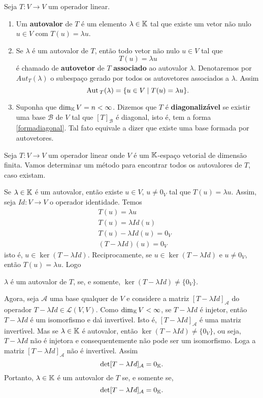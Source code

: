 \begin{definicao}
	Seja $T : V \to V$ um operador linear.
	\begin{enumerate}[label={\roman*})]
		\item Um \textbf{autovalor} de $T$ \'e um elemento $\lambda \in \mathbb{K}$ tal que existe um vetor n\~ao nulo $u \in V$ com $T(u) = \lambda u$.
		\item Se $\lambda$ \'e um autovalor de $T$, ent\~ao todo vetor n\~ao nulo $u \in V$ tal que
		\[
			T(u) = \lambda u
		\]
		\'e chamado de \textbf{autovetor} de $T$ \textbf{associado} ao autovalor $\lambda$. Denotaremos por $Aut_T(\lambda)$ o subespa\c{c}o gerado por todos os autovetores associados a $\lambda$. Assim
		\[
			{\rm Aut\,}_T(\lambda) = \{u \in V \mid T(u) = \lambda u\}.
		\]
		\item Suponha que $\dim_{\mathbb{K}} V = n < \infty$. Dizemos que $T$ \'e \textbf{diagonaliz\'avel} se existir uma base $\mathcal{B}$ de $V$ tal que $[T]_\mathcal{B}$ \'e diagonal, isto \'e, tem a forma \eqref{formadiagonal}. Tal fato equivale a dizer que existe uma base formada por autovetores.
	\end{enumerate}
\end{definicao}

Seja $T : V \to V$ um operador linear onde $V$ \'e um $\mathbb{K}$-espa\c{c}o vetorial de dimens\~ao finita. Vamos determinar um m\'etodo para encontrar todos os autovalores de $T$, caso existam.

Se $\lambda \in \mathbb{K}$ \'e um autovalor, ent\~ao existe $u \in V$, $u \ne 0_V$ tal que $T(u) = \lambda u$. Assim, seja $Id : V \to V$ o operador identidade. Temos
\begin{align*}
	&T(u) = \lambda u\\
	&T(u) = \lambda Id(u)\\
	&T(u) - \lambda Id(u) = 0_V\\
	&(T - \lambda Id)(u) = 0_V
\end{align*}
isto \'e, $u \in \ker (T - \lambda Id)$. Reciprocamente, se $u \in \ker (T - \lambda Id)$ e $u \ne 0_V$, ent\~ao $T(u) = \lambda u$. Logo
\begin{center}
		$\lambda$ \'e um autovalor de $T$, se, e somente, $\ker (T - \lambda Id) \ne \{0_V\}$.
\end{center}

Agora, seja $\mathcal{A}$ uma base qualquer de $V$ e considere a matriz $[T - \lambda Id]_\mathcal{A}$ do operador $T - \lambda Id \in \mathcal{L}(V,V)$. Como $\dim_{\mathbb{K}}V < \infty$, se $T - \lambda Id$ \'e injetor, ent\~ao $T - \lambda Id$ \'e um isomorfismo e da{\'\i} invert{\'\i}vel. Isto \'e, $[T - \lambda Id]_\mathcal{A}$ \'e uma matriz invert{\'\i}vel. Mas se $\lambda \in \mathbb{K}$ \'e autovalor, ent\~ao $\ker (T - \lambda Id) \ne \{0_V\}$, ou seja, $T - \lambda Id$ n\~ao \'e injetora e consequentemente n\~ao pode ser um isomorfismo. Loga a matriz $[T - \lambda Id]_\mathcal{A}$ n\~ao \'e invert{\'\i}vel. Assim
\[
\det [T - \lambda Id]_\mathcal{A} = 0_{\mathbb{K}}.
\]
Portanto, $\lambda \in \mathbb{K}$ \'e um autovalor de $T$ se, e somente se,
\[
\det [T - \lambda Id]_\mathcal{A} = 0_{\mathbb{K}}.
\]

